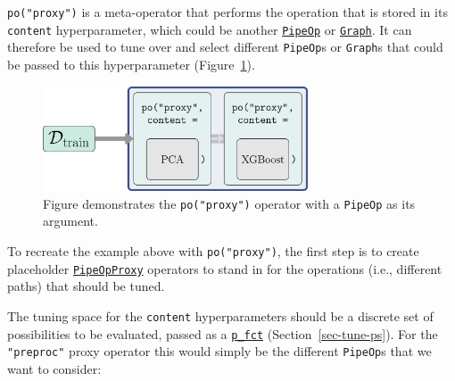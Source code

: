 \texttt{po("proxy")} is a meta-operator that performs the operation that
is stored in its \texttt{content} hyperparameter, which could be another
\href{https://mlr3pipelines.mlr-org.com/reference/PipeOp.html}{\texttt{PipeOp}}
or
\href{https://mlr3pipelines.mlr-org.com/reference/Graph.html}{\texttt{Graph}}.
It can therefore be used to tune over and select different
\texttt{PipeOp}s or \texttt{Graph}s that could be passed to this
hyperparameter (Figure~\ref{fig-pipelines-alternatives}).

\begin{figure}

{\centering \includegraphics[width=0.7\textwidth,height=\textheight]{chapters/chapter8/Figures/mlr3book_figures-25.png}

}

\caption{\label{fig-pipelines-alternatives}Figure demonstrates the
\texttt{po("proxy")} operator with a \texttt{PipeOp} as its argument.}

\end{figure}

To recreate the example above with \texttt{po("proxy")}, the first step
is to create placeholder
\href{https://mlr3pipelines.mlr-org.com/reference/mlr_pipeops_proxy.html}{\texttt{PipeOpProxy}}
operators to stand in for the operations (i.e., different paths) that
should be tuned.

\begin{Shaded}
\begin{Highlighting}[]
\OtherTok{=} \NormalTok{(}\NormalTok{, } \NormalTok{) }\SpecialCharTok{\%\textgreater{}\textgreater{}\%}
  \NormalTok{(}\NormalTok{, } \NormalTok{)}
\OtherTok{=} 
\end{Highlighting}
\end{Shaded}

The tuning space for the \texttt{content} hyperparameters should be a
discrete set of possibilities to be evaluated, passed as a
\href{https://paradox.mlr-org.com/reference/Domain.html}{\texttt{p\_fct}}
(Section~\ref{sec-tune-ps}). For the \texttt{"preproc"} proxy operator
this would simply be the different \texttt{PipeOp}s that we want to
consider:


